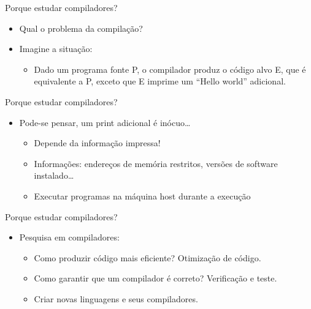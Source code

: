 \begin{frame}{Porque estudar compiladores?}

    \begin{itemize}
        \item
        Qual o problema da compilação?
        \item
        Imagine a situação:

        \begin{itemize}

            \item
            Dado um programa fonte P, o compilador produz o código alvo E, que é
            equivalente a P, exceto que E imprime um ``Hello world'' adicional.
        \end{itemize}
    \end{itemize}
\end{frame}

\begin{frame}{Porque estudar compiladores?}

    \begin{itemize}

        \item
        Pode-se pensar, um print adicional é inócuo\ldots{}

        \begin{itemize}

            \item
            Depende da informação impressa!
            \item
            Informações: endereços de memória restritos, versões de software
            instalado\ldots{}
            \item
            Executar programas na máquina host durante a execução
        \end{itemize}
    \end{itemize}
\end{frame}

\begin{frame}{Porque estudar compiladores?}

    \begin{itemize}

        \item
        Pesquisa em compiladores:

        \begin{itemize}

            \item
            Como produzir código mais eficiente? Otimização de código.
            \item
            Como garantir que um compilador é correto? Verificação e teste.
            \item
            Criar novas linguagens e seus compiladores.
        \end{itemize}
    \end{itemize}
\end{frame}

